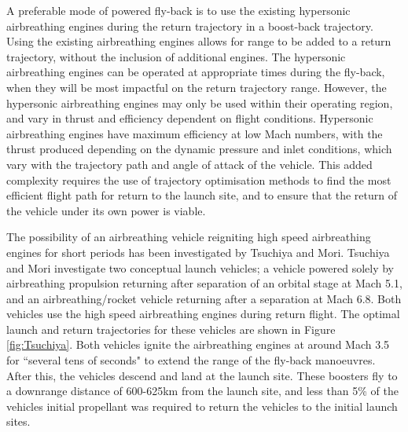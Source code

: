 A preferable mode of powered fly-back is to use the existing hypersonic airbreathing engines during the return trajectory in a boost-back trajectory. Using the existing airbreathing engines allows for range to be added to a return trajectory, without the inclusion of additional engines. The hypersonic airbreathing engines can be operated at appropriate times during the fly-back, when they will be most impactful on the return trajectory range. However, the hypersonic airbreathing engines may only be used within their operating region, and vary in thrust and efficiency dependent on flight conditions. Hypersonic airbreathing engines have maximum efficiency at low Mach numbers\cite{Preller2017b}, with the thrust produced depending on the dynamic pressure and inlet conditions, which vary with the trajectory path and angle of attack of the vehicle. This added complexity requires the use of trajectory optimisation methods to find the most efficient flight path for return to the launch site, and to ensure that the return of the vehicle under its own power is viable. 

The possibility of an airbreathing vehicle reigniting high speed airbreathing engines for short periods has been investigated by Tsuchiya and Mori\cite{Tsuchiya2005}.  Tsuchiya and Mori investigate two conceptual launch vehicles; a vehicle powered solely by airbreathing propulsion returning after separation of an orbital stage at Mach 5.1, and an airbreathing/rocket vehicle returning after a separation at Mach 6.8\cite{Tsuchiya2005}.  Both vehicles use the high speed airbreathing engines during return flight. The optimal launch and return trajectories for these vehicles are shown in Figure \ref{fig:Tsuchiya}. Both vehicles ignite the airbreathing engines at around Mach 3.5 for ``several tens of seconds" to extend the range of the fly-back manoeuvres. After this, the vehicles descend and land at the launch site. 
These boosters fly to a downrange distance of 600-625km from the launch site, and less than 5\% of the vehicles initial propellant was required to return the vehicles to the initial launch sites\cite{Tsuchiya2005}.

